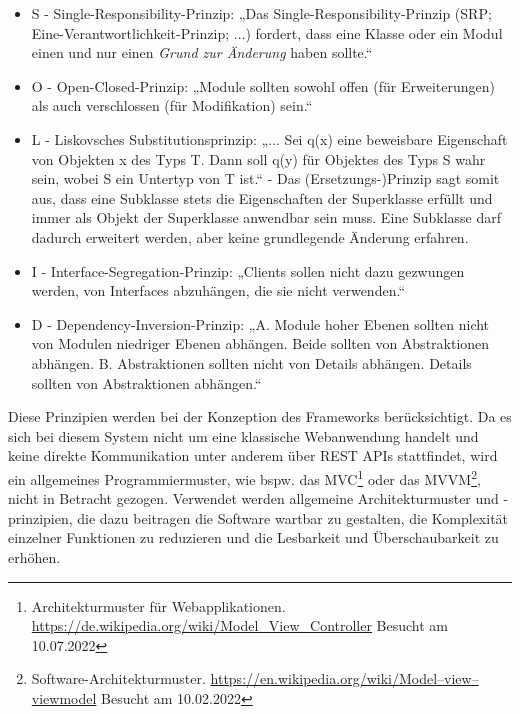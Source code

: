     \begin{itemize}
        \item S - Single-Responsibility-Prinzip: „Das Single-Responsibility-Prinzip (SRP; Eine-Verantwortlichkeit-Prinzip; ...) fordert, dass eine Klasse oder ein Modul einen und nur einen \textit{Grund zur Änderung} haben sollte.“ \cite{cleancode2009}
        \item O - Open-Closed-Prinzip: „Module sollten sowohl offen (für Erweiterungen) als auch verschlossen (für Modifikation) sein.“ \cite{ocpmeyer1988}
        \item L - Liskovsches Substitutionsprinzip: „... Sei q(x) eine beweisbare Eigenschaft von Objekten x des Typs T. Dann soll q(y) für Objektes des Typs S wahr sein, wobei S ein Untertyp von T ist.“ \cite{liskov2001behavioral} - Das (Ersetzungs-)Prinzip sagt somit aus, dass eine 
        Subklasse stets die Eigenschaften der Superklasse erfüllt und immer als Objekt der Superklasse anwendbar sein muss. Eine Subklasse darf dadurch erweitert werden, aber 
        keine grundlegende Änderung erfahren. 
        \item I - Interface-Segregation-Prinzip: „Clients sollen nicht dazu gezwungen werden, von Interfaces abzuhängen, die sie nicht verwenden.“ \cite{martin1996interface}
        \item D - Dependency-Inversion-Prinzip: „A. Module hoher Ebenen sollten nicht von Modulen niedriger Ebenen abhängen. Beide sollten von Abstraktionen abhängen. B. Abstraktionen sollten nicht von Details abhängen. Details sollten von Abstraktionen abhängen.“ \cite{martin2003agile}
    \end{itemize}
    Diese Prinzipien werden bei der Konzeption des Frameworks berücksichtigt. Da es sich bei diesem System nicht um eine klassische 
    Webanwendung handelt und keine direkte Kommunikation unter anderem über \acs{REST} \acs{API}s stattfindet, wird ein allgemeines 
    Programmiermuster, wie bspw. das \ac{MVC}\footnote{Architekturmuster für Webapplikationen. \url{https://de.wikipedia.org/wiki/Model_View_Controller} Besucht am 10.07.2022} 
    oder das \ac{MVVM}\footnote{Software-Architekturmuster. \url{https://en.wikipedia.org/wiki/Model–view–viewmodel} Besucht am 10.02.2022 }, nicht 
    in Betracht gezogen. Verwendet werden allgemeine Architekturmuster und -prinzipien, die dazu beitragen die Software wartbar 
    zu gestalten, die Komplexität einzelner Funktionen zu reduzieren und die Lesbarkeit und Überschaubarkeit zu erhöhen. 
    
